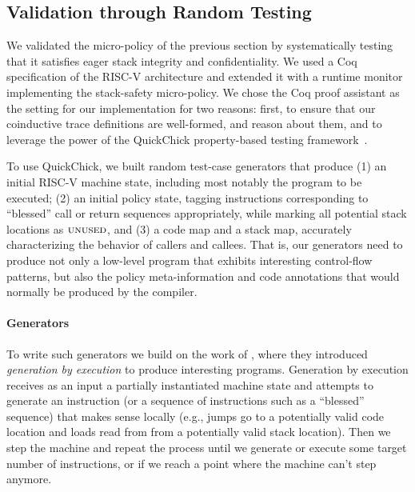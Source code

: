 \documentclass[acmsmall,review,anonymous]{acmart}\settopmatter{printfolios=true,printccs=false,printacmref=false}
\begin{document}
\subsection*{Validation through Random Testing}
\label{sec:testing}

We validated the micro-policy of the previous section by systematically
testing that it satisfies eager stack integrity and
confidentiality. We used a Coq specification of the RISC-V
architecture  and
extended it with a runtime monitor implementing the stack-safety
micro-policy. We chose the
Coq proof assistant as the setting for our implementation for two
reasons: first, to ensure that our coinductive trace definitions are
well-formed, and reason about them, and to leverage the power of the QuickChick
property-based testing framework~\citep{Pierce:SF4}.

To use QuickChick, we built random test-case generators that produce
(1) an initial RISC-V machine state, including most notably
  the program to be executed;
(2)
  an initial policy state, tagging instructions corresponding to
  ``blessed'' call or return sequences appropriately, while marking
  all potential stack locations as $\textsc{unused}$, and
(3)
 a code map and a stack map, accurately characterizing the behavior
  of callers and callees.
%
That is, our generators need to produce not only a low-level program
that exhibits interesting control-flow patterns, but also the policy
meta-information and code annotations that would normally be produced
by the compiler.

\paragraph*{Generators}

To write such generators we build on the work of ,
where they introduced {\em generation by execution} to produce
interesting programs. Generation by execution receives as an input a
partially instantiated machine state and attempts to generate an
instruction (or a sequence of instructions such as a ``blessed''
sequence) that makes sense locally (e.g., jumps go to a potentially valid
code location and loads read from from a potentially valid stack
location). Then
we step the machine and repeat the process until we generate or
execute some target number of instructions, or if we reach a point
where the machine can't step anymore.
\end{document}
